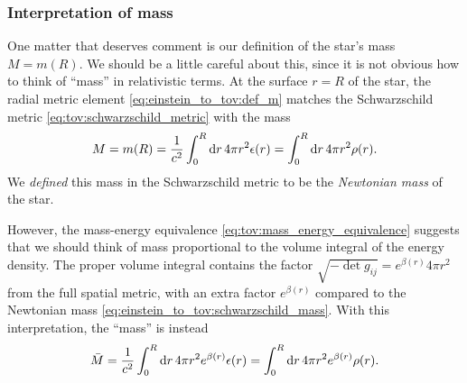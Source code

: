 \subsubsection{Interpretation of mass}

One matter that deserves comment is our definition of the star's mass $M = m(R)$.
We should be a little careful about this, since it is not obvious how to think of ``mass'' in relativistic terms.
At the surface $r=R$ of the star, the radial metric element \eqref{eq:einstein_to_tov:def_m} matches the Schwarzschild metric \eqref{eq:tov:schwarzschild_metric} with the mass
\begin{equation}
	M = m(R) = \frac{1}{c^2} \integral{4 \pi r^2 \epsilon(r)}{r}{0}{R} = \integral{4 \pi r^2 \rho(r)}{r}{0}{R} .
	\label{eq:einstein_to_tov:schwarzschild_mass}
\end{equation}
We \emph{defined} this mass in the Schwarzschild metric to be the \emph{Newtonian mass} of the star.

However, the mass-energy equivalence \eqref{eq:tov:mass_energy_equivalence} suggests that we should think of mass proportional to the volume integral of the energy density.
The proper volume integral contains the factor $\sqrt{-\det{g_{ij}}} = e^{\beta(r)} 4 \pi r^2$ from the full spatial metric, with an extra factor $e^{\beta(r)}$ compared to the Newtonian mass \eqref{eq:einstein_to_tov:schwarzschild_mass}.
With this interpretation, the ``mass'' is instead
\begin{equation}
	\bar{M} = \frac{1}{c^2} \integral{4 \pi r^2 e^{\beta(r)} \epsilon(r)}{r}{0}{R}
	        = \integral{4 \pi r^2 e^{\beta(r)} \rho(r)}{r}{0}{R} .
\label{eq:einstein_to_tov:alternative_mass}
\end{equation}

